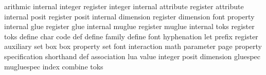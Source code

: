 \startcolumns \small \setupinterlinespace
\starttabulate[|||]
\BC arithmic              \NC \type {\advance}         \NC \NR
\BC internal integer      \NC \type {\hangafter}       \NC \NR
\BC register integer      \NC \type {\countdef}        \NC \NR
\BC internal attribute    \NC {}           \NC \NR
\BC register attribute    \NC \type {\attributedef}    \NC \NR
\BC internal posit        \NC {}           \NC \NR
\BC register posit        \NC \type {\floatdef}        \NC \NR
\BC internal dimension    \NC \type {\hangindent}      \NC \NR
\BC register dimension    \NC \type {\dimendef}        \NC \NR
\BC font property         \NC \type {\efcode}          \NC \NR
\BC internal glue         \NC \type {\baselineskip}    \NC \NR
\BC register glue         \NC \type {\skipdef}         \NC \NR
\BC internal muglue       \NC \type {\medmuskip}       \NC \NR
\BC register muglue       \NC \type {\muskipdef}       \NC \NR
\BC internal toks         \NC \type {\everypar}        \NC \NR
\BC register toks         \NC \type {\toksdef}         \NC \NR
\BC define char code      \NC \type {\catcode}         \NC \NR
\BC def                   \NC \type {\def}             \NC \NR
\BC define family         \NC \type {\scriptfont}      \NC \NR
\BC define font           \NC \type {\font}            \NC \NR
\BC hyphenation           \NC \type {\hjcode}          \NC \NR
\BC let                   \NC \type {\let}             \NC \NR
\BC prefix                \NC \type {\global}          \NC \NR
\BC register              \NC \type {\count}           \NC \NR
\BC auxiliary             \NC \type {\prevgraf}        \NC \NR
\BC set box               \NC \type {\setbox}          \NC \NR
\BC box property          \NC \type {\wd}              \NC \NR
\BC set font              \NC \type {\nullfont}        \NC \NR
\BC interaction           \NC \type {\batchmode}       \NC \NR
\BC math parameter        \NC \type {\setmathatomrule} \NC \NR
\BC page property         \NC \type {\pagegoal}        \NC \NR
\BC specification         \NC \type {\parshape}        \NC \NR
\BC shorthand def         \NC \type {\chardef}         \NC \NR
\BC association           \NC \type {\associateunit}   \NC \NR
\BC lua value             \NC {}         \NC \NR
\BC integer               \NC \type {\integerdef}      \NC \NR
\BC posit                 \NC \type {\positdef}        \NC \NR
\BC dimension             \NC \type {\dimensiondef}    \NC \NR
\BC gluespec              \NC \type {\gluespecdef}     \NC \NR
\BC mugluespec            \NC \type {\mugluespecdef}   \NC \NR
\BC index                 \NC \type {\parameterdef}    \NC \NR
\BC combine toks          \NC \type {\toksapp}         \NC \NR
\stoptabulate
\stopcolumns

